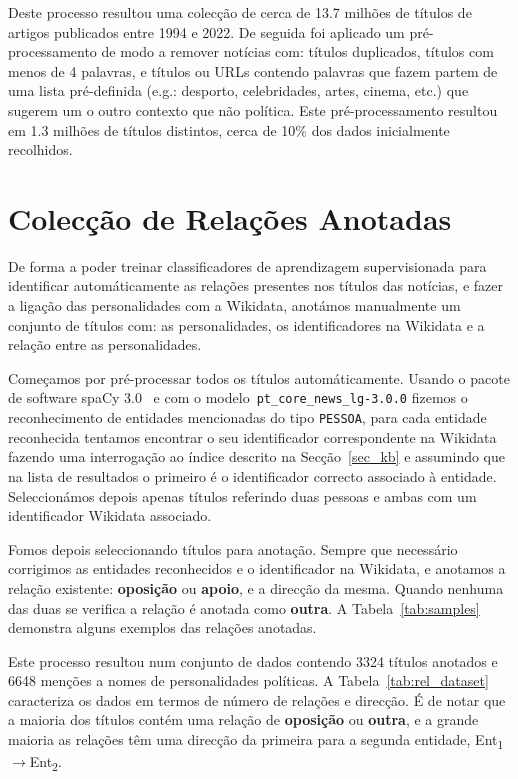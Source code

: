 \documentclass[a4paper, twocolumn, 11pt, twoside]{article}
\begin{document}
Deste processo resultou uma colecção de cerca de 13.7 milhões de títulos de artigos publicados entre 1994 e 2022. De seguida foi aplicado um pré-processamento de modo a remover notícias com: títulos duplicados, títulos com menos de 4 palavras, e títulos ou URLs contendo palavras que fazem partem de uma lista pré-definida (e.g.: desporto, celebridades, artes, cinema, etc.) que sugerem um o outro contexto que não política. Este pré-processamento resultou em 1.3 milhões de títulos distintos, cerca de 10\% dos dados inicialmente recolhidos.

\section{Colecção de Relações Anotadas}
\label{sec:rel_data_annot}

De forma a poder treinar classificadores de aprendizagem supervisionada para identificar automáticamente as relações presentes nos títulos das notícias, e fazer a ligação das personalidades com a Wikidata, anotámos manualmente um conjunto de títulos com: as personalidades, os identificadores na Wikidata e a relação entre as personalidades.

Começamos por pré-processar todos os títulos automáticamente. Usando o pacote de software spaCy 3.0~\citep{spacy} e com o modelo~\texttt{pt\_core\_news\_lg-3.0.0} fizemos o reconhecimento de entidades mencionadas do tipo \texttt{PESSOA}, para cada entidade reconhecida tentamos encontrar o seu identificador correspondente na Wikidata fazendo uma interrogação ao índice descrito na Secção~\ref{sec_kb} e assumindo que na lista de resultados o primeiro é o identificador correcto associado à entidade. Seleccionámos depois apenas títulos referindo duas pessoas e ambas com um identificador Wikidata associado.

Fomos depois seleccionando títulos para anotação. Sempre que necessário corrigimos as entidades reconhecidos e o identificador na Wikidata, e anotamos a relação existente: \textbf{oposição} ou \textbf{apoio}, e a direcção da mesma. Quando nenhuma das duas se verifica a relação é anotada como \textbf{outra}. A Tabela~\ref{tab:samples} demonstra alguns exemplos das relações anotadas.

Este processo resultou num conjunto de dados contendo 3324 títulos anotados e 6648 menções a nomes de personalidades políticas. A Tabela~\ref{tab:rel_dataset} caracteriza os dados em termos de número de relações e direcção. É de notar que a maioria dos títulos contém uma relação de \textbf{oposição} ou \textbf{outra}, e a grande maioria as relações têm uma direcção da primeira para a segunda entidade, Ent\textsubscript{1}$\rightarrow$Ent\textsubscript{2}.
\end{document}

